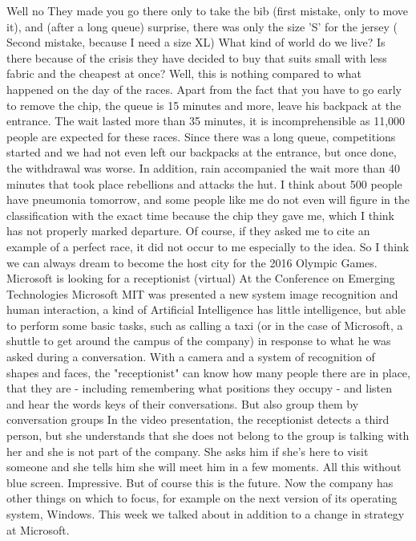 Well no
They made you go there only to take the bib (first mistake, only to move it), and (after a long queue) surprise, there was only the size 'S' for the jersey ( Second mistake, because I need a size XL)
What kind of world do we live?
Is there because of the crisis they have decided to buy that suits small with less fabric and the cheapest at once?
Well, this is nothing compared to what happened on the day of the races.
Apart from the fact that you have to go early to remove the chip, the queue is 15 minutes and more, leave his backpack at the entrance.
The wait lasted more than 35 minutes, it is incomprehensible as 11,000 people are expected for these races.
Since there was a long queue, competitions started and we had not even left our backpacks at the entrance, but once done, the withdrawal was worse.
In addition, rain accompanied the wait more than 40 minutes that took place rebellions and attacks the hut.
I think about 500 people have pneumonia tomorrow, and some people like me do not even will figure in the classification with the exact time because the chip they gave me, which I think has not properly marked departure.
Of course, if they asked me to cite an example of a perfect race, it did not occur to me especially to the idea.
So I think we can always dream to become the host city for the 2016 Olympic Games.
Microsoft is looking for a receptionist (virtual)
At the Conference on Emerging Technologies Microsoft MIT was presented a new system image recognition and human interaction, a kind of Artificial Intelligence has little intelligence, but able to perform some basic tasks, such as calling a taxi (or in the case of Microsoft, a shuttle to get around the campus of the company) in response to what he was asked during a conversation.
With a camera and a system of recognition of shapes and faces, the "receptionist" can know how many people there are in place, that they are - including remembering what positions they occupy - and listen and hear the words keys of their conversations.
But also group them by conversation groups
In the video presentation, the receptionist detects a third person, but she understands that she does not belong to the group is talking with her and she is not part of the company.
She asks him if she's here to visit someone and she tells him she will meet him in a few moments.
All this without blue screen.
Impressive.
But of course this is the future.
Now the company has other things on which to focus, for example on the next version of its operating system, Windows.
This week we talked about in addition to a change in strategy at Microsoft.
